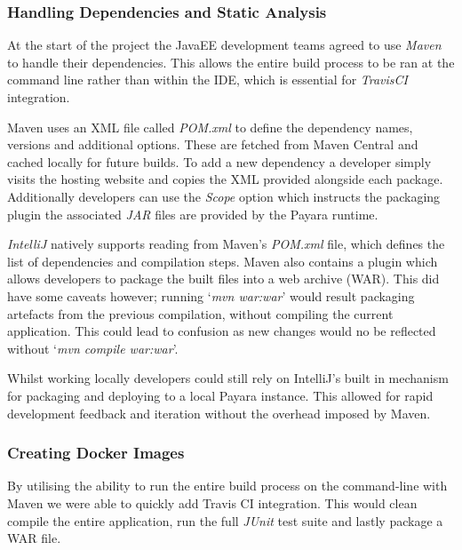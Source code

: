 \subsubsection{Handling Dependencies and Static Analysis}
\par
At the start of the project the JavaEE development teams agreed to use \textit{Maven}\cite{Maven} to handle their dependencies. This allows the entire build process to be ran at the command line rather than within the IDE, which is essential for \textit{TravisCI} integration.

\par
Maven uses an XML file called \textit{POM.xml} to define the dependency names, versions and additional options. These are fetched from Maven Central and cached locally for future builds. To add a new dependency a developer simply visits the hosting website and copies the XML provided alongside each package. Additionally developers can use the \textit{Scope} option which instructs the packaging plugin the associated \textit{JAR} files are provided by the Payara runtime.

\par
\textit{IntelliJ} natively supports reading from Maven's \textit{POM.xml} file, which defines the list of dependencies and compilation steps. Maven also contains a plugin which allows developers to package the built files into a web archive (WAR). This did have some caveats however; running 
`\textit{mvn war:war}' would result packaging artefacts from the previous compilation, without compiling the current application. This could lead to confusion as new changes would no be reflected without `\textit{mvn compile war:war}'.

\par
Whilst working locally developers could still rely on IntelliJ's built in mechanism for packaging and deploying to a local Payara instance. This allowed for rapid development feedback and iteration without the overhead imposed by Maven.

\subsubsection{Creating Docker Images}
\par
By utilising the ability to run the entire build process on the command-line with Maven we were able to quickly add Travis CI integration. This would clean compile the entire application, run the full \textit{JUnit} test suite and lastly package a WAR file.

